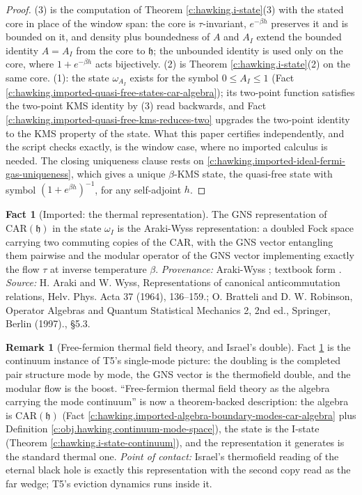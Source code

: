 \documentclass[11pt]{article}
\theoremstyle{definition}
\newtheorem{fact}[theorem]{Fact}
\newtheorem{remark}[theorem]{Remark}
\theoremstyle{plain}
\providecommand{\CAR}{}\renewcommand{\CAR}{\mathrm{CAR}}
\begin{document}
\begin{proof}
(3) is the computation of Theorem \ref{c:hawking.i-state}(3) with the stated core in place of the window span: the core is $\tau$-invariant, $e^{-\beta h}$ preserves it and is bounded on it, and density plus boundedness of $A$ and $A_I$ extend the bounded identity $A = A_I$ from the core to $\mathfrak{h}$; the unbounded identity is used only on the core, where $1 + e^{-\beta h}$ acts bijectively. (2) is Theorem \ref{c:hawking.i-state}(2) on the same core. (1): the state $\omega_{A_I}$ exists for the symbol $0 \le A_I \le 1$ (Fact \ref{c:hawking.imported-quasi-free-states-car-algebra}); its two-point function satisfies the two-point KMS identity by (3) read backwards, and Fact \ref{c:hawking.imported-quasi-free-kms-reduces-two} upgrades the two-point identity to the KMS property of the state. What this paper certifies independently, and the script checks exactly, is the window case, where no imported calculus is needed. The closing uniqueness clause rests on \ref{c:hawking.imported-ideal-fermi-gas-uniqueness}, which gives a unique $\beta$-KMS state, the quasi-free state with symbol $(1 + e^{\beta h})^{-1}$, for any self-adjoint $h$.

\end{proof}

\begin{fact}[Imported: the thermal representation]\label{c:hawking.imported-thermal-representation}
The GNS representation of $\CAR(\mathfrak{h})$ in the state $\omega_I$ is the Araki-Wyss representation: a doubled Fock space carrying two commuting copies of the CAR, with the GNS vector entangling them pairwise and the modular operator of the GNS vector implementing exactly the flow $\tau$ at inverse temperature $\beta$. \emph{Provenance:} Araki-Wyss \cite{ArakiWyss1964}; textbook form \cite[\S 5.3]{BratteliRobinson1997}.
\emph{Source:} H. Araki and W. Wyss, Representations of canonical anticommutation relations, Helv. Phys. Acta 37 (1964), 136--159.; O. Bratteli and D. W. Robinson, Operator Algebras and Quantum Statistical Mechanics 2, 2nd ed., Springer, Berlin (1997)., \S 5.3.
\end{fact}

\begin{remark}[Free-fermion thermal field theory, and Israel's double]\label{c:note.hawking.free-fermion-thermal-field-theory-israels}
Fact \ref{c:hawking.imported-thermal-representation} is the continuum instance of T5's single-mode picture: the doubling is the completed pair structure mode by mode, the GNS vector is the thermofield double, and the modular flow is the boost. ``Free-fermion thermal field theory as the algebra carrying the mode continuum'' is now a theorem-backed description: the algebra is $\CAR(\mathfrak{h})$ (Fact \ref{c:hawking.imported-algebra-boundary-modes-car-algebra} plus Definition \ref{c:obj.hawking.continuum-mode-space}), the state is the I-state (Theorem \ref{c:hawking.i-state-continuum}), and the representation it generates is the standard thermal one. \emph{Point of contact:} Israel's thermofield reading of the eternal black hole \cite{Israel1976} is exactly this representation with the second copy read as the far wedge; T5's eviction dynamics runs inside it.
\end{remark}
\end{document}
